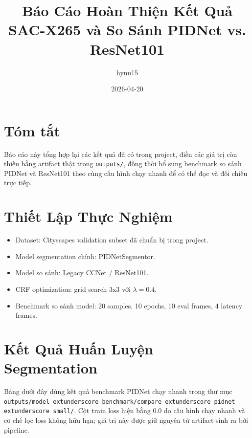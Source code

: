 \documentclass[12pt,a4paper]{article}
\title{Báo Cáo Hoàn Thiện Kết Quả SAC-X265 và So Sánh PIDNet vs. ResNet101}
\author{hynu15}
\date{2026-04-20}
\begin{document}
\maketitle

\section{Tóm tắt}
Báo cáo này tổng hợp lại các kết quả đã có trong project, điền các giá trị còn thiếu bằng artifact thật trong \texttt{outputs/}, đồng thời bổ sung benchmark so sánh PIDNet và ResNet101 theo cùng cấu hình chạy nhanh để có thể đọc và đối chiếu trực tiếp.

\section{Thiết Lập Thực Nghiệm}
\begin{itemize}
  \item Dataset: Cityscapes validation subset đã chuẩn bị trong project.
  \item Model segmentation chính: PIDNetSegmentor.
  \item Model so sánh: Legacy CCNet / ResNet101.
  \item CRF optimization: grid search 3x3 với \(\lambda=0.4\).
  \item Benchmark so sánh model: 20 samples, 10 epochs, 10 eval frames, 4 latency frames.
\end{itemize}

\section{Kết Quả Huấn Luyện Segmentation}
Bảng dưới đây dùng kết quả benchmark PIDNet chạy nhanh trong thư mục \texttt{outputs/model	extunderscore benchmark/compare	extunderscore pidnet	extunderscore small/}. Cột train loss hiện bằng 0.0 do cấu hình chạy nhanh và cơ chế lọc loss không hữu hạn; giá trị này được giữ nguyên từ artifact sinh ra bởi pipeline.
\end{document}
